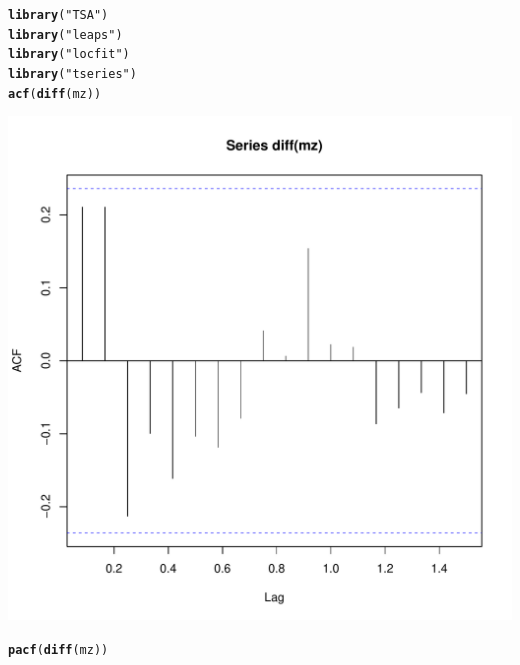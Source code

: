 \documentclass{article}\usepackage[]{graphicx}\usepackage[]{color}
\makeatletter
\def\maxwidth{ %
  \ifdim\Gin@nat@width>\linewidth
    \linewidth
  \else
    \Gin@nat@width
  \fi
}
\newcommand{\hlstr}[1]{\textcolor[rgb]{0.192,0.494,0.8}{#1}}%
\newcommand{\hlstd}[1]{\textcolor[rgb]{0.345,0.345,0.345}{#1}}%
\newcommand{\hlkwd}[1]{\textcolor[rgb]{0.737,0.353,0.396}{\textbf{#1}}}%
\newenvironment{kframe}{%
 \def\at@end@of@kframe{}%
 \ifinner\ifhmode%
  \def\at@end@of@kframe{\end{minipage}}%
  \begin{minipage}{\columnwidth}%
 \fi\fi%
 \def\FrameCommand##1{\hskip\@totalleftmargin \hskip-\fboxsep
 \colorbox{shadecolor}{##1}\hskip-\fboxsep
     \hskip-\linewidth \hskip-\@totalleftmargin \hskip\columnwidth}%
 \MakeFramed {\advance\hsize-\width
   \@totalleftmargin\z@ \linewidth\hsize
   \@setminipage}}%
 {\par\unskip\endMakeFramed%
 \at@end@of@kframe}
\newenvironment{knitrout}{}{} %
\makeatother
\begin{document}
\begin{knitrout}
\color{fgcolor}\begin{kframe}
\begin{alltt}
\hlkwd{library}\hlstd{(}\hlstr{"TSA"}\hlstd{)}
\hlkwd{library}\hlstd{(}\hlstr{"leaps"}\hlstd{)}
\hlkwd{library}\hlstd{(}\hlstr{"locfit"}\hlstd{)}
\hlkwd{library}\hlstd{(}\hlstr{"tseries"}\hlstd{)}
\hlkwd{acf}\hlstd{(}\hlkwd{diff}\hlstd{(mz))}
\end{alltt}
\end{kframe}
\includegraphics[width=\maxwidth]{figure/unnamed-chunk-3-1} 
\begin{kframe}\begin{alltt}
\hlkwd{pacf}\hlstd{(}\hlkwd{diff}\hlstd{(mz))}
\end{alltt}
\end{kframe}

\end{knitrout}
\end{document}
